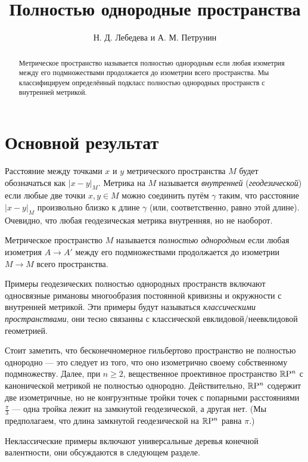 \documentclass[a4paper,10pt]{article}
\def\thetitle{Полностью однородные пространства}
\def\theauthors{Н. Д. Лебедева и А. М. Петрунин}
\begin{document}


\title{\thetitle}
\author{\theauthors}
\date{}
\maketitle

\begin{abstract}
Метрическое пространство называется полностью однородным если любая изометрия между его подмножествами продолжается до изометрии всего пространства.
Мы классифицируем определённый подкласс полностью однородных пространств с внутренней метрикой.
\end{abstract}

\section{Основной результат}

Расстояние между точками $x$ и $y$ метрического пространства $M$ будет обозначаться как $|x-y|_M$.
Метрика на $M$ называется \emph{внутренней} (\emph{геодезической}) если любые две точки $x,y\in M$ можно соединить путём $\gamma$ таким, что расстояние $|x-y|_M$ произвольно близко к длине $\gamma$ (или, соответственно, равно этой длине).
Очевидно, что любая геодезическая метрика внутренняя, но не наоборот.

Метрическое пространство $M$ называется \emph{полностью однородным} если любая изометрия $A\to A'$ между его подмножествами продолжается до изометрии $M\to M$ всего пространства.

Примеры геодезических полностью однородных пространств включают односвязные римановы многообразия постоянной кривизны и окружности с внутренней метрикой.
Эти примеры будут называться \emph{классическими пространствами},
они тесно связанны с классической евклидовой/неевклидовой геометрией.

Стоит заметить, что бесконечномерное гильбертово пространство не полностью однородно --- это следует из того, что оно изометрично своему собственному подмножеству.
Далее, при $n\ge2$, вещественное проективное пространство $\mathbb{R}\mathrm{P}^n$ с канонической метрикой не полностью однородно.
Действительно, $\mathbb{R}\mathrm{P}^n$ содержит две изометричные, но не конгруэнтные тройки точек с попарными расстояниями $\tfrac\pi3$ ---
одна тройка лежит на замкнутой геодезической, а другая нет. 
(Мы предполагаем, что длина замкнутой геодезической на $\mathbb{R}\mathrm{P}^n$ равна $\pi$.)

Неклассические примеры включают универсальные деревья конечной валентности, они обсуждаются в следующем разделе.
\end{document}
